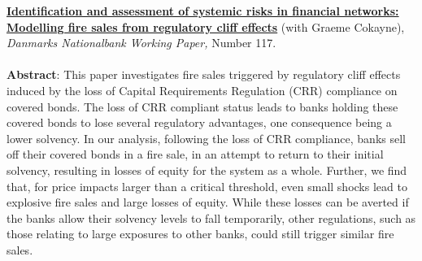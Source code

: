 \documentclass[11pt]{res} %
\begin{document}
\begin{resume}
\begin{etaremune}
\item \href{http://www.nationalbanken.dk/en/publications/Documents/2017/08/DNWP_117_Fire%20sales.pdf}{\bf Identification and assessment of systemic risks in financial networks: Modelling fire sales from regulatory cliff effects} (with Graeme Cokayne), \textit{Danmarks Nationalbank Working Paper,} Number 117.\\
\\[-0.9em]
\textbf{Abstract}: 
This paper investigates fire sales triggered by regulatory cliff effects induced by the loss of Capital Requirements Regulation (CRR) compliance on covered bonds. The loss of CRR compliant status leads to banks holding these covered bonds to lose several regulatory advantages, one consequence being a lower solvency. In our analysis, following the loss of CRR compliance, banks sell off their covered bonds in a fire sale, in an attempt to return to their initial solvency, resulting in losses of equity for the system as a whole. Further, we find that, for price impacts larger than a critical threshold, even small shocks lead to explosive fire sales and large losses of equity. While these losses can be averted if the banks allow their solvency levels to fall temporarily, other regulations, such as those relating to large exposures to other banks, could still trigger similar fire sales.%

\vspace{0.2in} %



\end{etaremune}
\end{resume}
\end{document}
